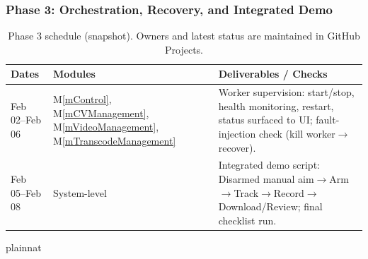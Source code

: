 \documentclass[12pt, titlepage]{article}
\newcommand{\mref}[1]{M\ref{#1}}
\begin{document}
\subsubsection{Phase 3: Orchestration, Recovery, and Integrated Demo}
\renewcommand{\arraystretch}{1.15}
\begin{table}[H]
  \centering
  \begin{tabular}{|p{2.6cm}|p{5.2cm}|p{6.2cm}|}
    \hline
    \textbf{Dates}                                                                              & \textbf{Modules} & \textbf{Deliverables / Checks} \\
    \hline
    Feb 02--Feb 06                                                                              &
    \mref{mControl}, \mref{mCVManagement}, \mref{mVideoManagement}, \mref{mTranscodeManagement} &
    Worker supervision: start/stop, health monitoring, restart, status surfaced to UI;
    fault-injection check (kill worker$\rightarrow$recover).                                                                                        \\
    \hline
    Feb 05--Feb 08                                                                              &
    System-level                                                                                &
    Integrated demo script: Disarmed manual aim$\rightarrow$Arm$\rightarrow$Track$\rightarrow$Record$\rightarrow$Download/Review;
    final checklist run.                                                                                                                            \\
    \hline
  \end{tabular}
  \caption{Phase 3 schedule (snapshot). Owners and latest status are maintained in GitHub Projects.}
  \label{TblTimelineP3}
\end{table}

 {plainnat}


\newpage{}
\end{document}
